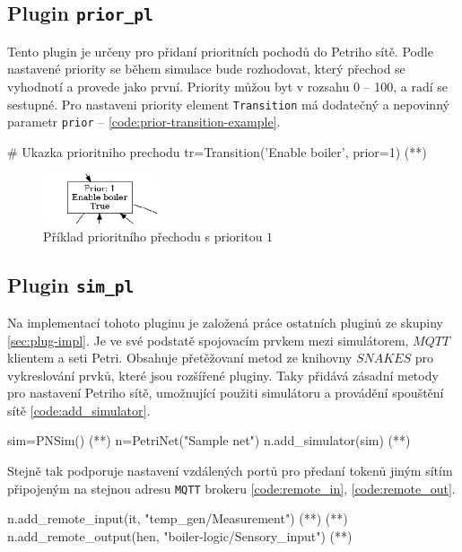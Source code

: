 \subsection{Plugin \texttt{prior\_pl}}
\label{subsec:prior_pl}
Tento plugin je určeny pro přidaní prioritních pochodů do Petriho sítě. Podle nastavené priority se během simulace bude rozhodovat, který přechod se vyhodnotí a provede jako první. Priority můžou byt v rozsahu 0 -- 100, a radí se sestupné. Pro nastaveni priority element \texttt{Transition} má dodatečný a nepovinný parametr \texttt{prior} -- \ref{code:prior-transition-example}.
\begin{python}
  # Ukazka prioritniho prechodu
  tr=Transition('Enable boiler', prior=1) (*\label{code:prior-transition-example}*)
\end{python}

\begin{figure}[hbt]
  \centering
  \includegraphics[width=0.3\textwidth]{obrazky-figures/prior-transition.png}
  \caption{Příklad prioritního přechodu s prioritou $1$}
  \label{prior-transition}
\end{figure}

\subsection{Plugin \texttt{sim\_pl}}
\label{subsec:sim_pl}
Na implementací tohoto pluginu je založená práce ostatních pluginů ze skupiny \ref{sec:plug-impl}. Je ve své podstatě spojovacím prvkem mezi simulátorem, $MQTT$ klientem a seti Petri. Obsahuje přetěžovaní metod ze knihovny $SNAKES$ pro vykreslování prvků, které jsou rozšířené pluginy. Taky přidává zásadní metody pro nastavení Petriho sítě, umožnující použiti simulátoru a provádění spouštění sítě \ref{code:add_simulator}.
\begin{python}
  sim=PNSim() (*\label{code:sim-add}*)
  n=PetriNet("Sample net")
  n.add_simulator(sim) (*\label{code:add_simulator}*)
\end{python}

Stejně tak podporuje nastavení vzdálených portů pro předaní tokenů jiným sítím připojeným na stejnou adresu \texttt{MQTT} brokeru \ref{code:remote_in}, \ref{code:remote_out}.

\begin{python}
  n.add_remote_input(it, "temp_gen/Measurement") (*\label{code:remote_in}*) (*\label{code:remote-in-out}*)
  n.add_remote_output(hen, "boiler-logic/Sensory_input") (*\label{code:remote_out}*)
\end{python}

